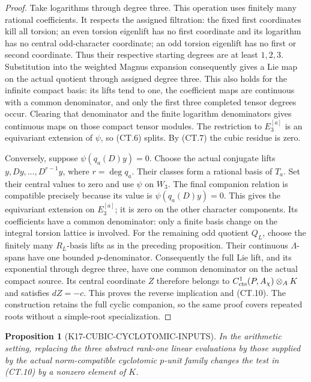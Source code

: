 \documentclass[11pt,a4paper]{article}
\newtheorem{proposition}[theorem]{Proposition}
\theoremstyle{definition}
\begin{document}
\begin{proof}
Take logarithms through degree three. This operation uses finitely
many rational coefficients. It respects the assigned filtration:
the fixed first coordinates kill all torsion; an even torsion
eigenlift has no first coordinate and its logarithm has no central
odd-character coordinate; an odd torsion eigenlift has no first
or second coordinate. Thus their respective starting degrees are
at least \(1,2,3\). Substitution into the weighted Magnus
expansion consequently gives a Lie map on the actual quotient
through assigned degree three. This also holds for the infinite
compact basis: its lifts tend to one, the coefficient maps are
continuous with a common denominator, and only the first three
completed tensor degrees occur. Clearing that denominator and
the finite logarithm denominators gives continuous maps on those
compact tensor modules. The restriction to \(E_3^{[a]}\) is an
equivariant extension of \(\psi\), so (CT.6) splits. By (CT.7)
the cubic residue is zero.

Conversely, suppose \(\psi(q_a(D)y)=0\). Choose the actual
conjugate lifts \(y,Dy,\ldots,D^{r-1}y\), where \(r=\deg q_a\).
Their classes form a rational basis of \(T_a\). Set their
central values to zero and use \(\psi\) on \(W_3\). The final
companion relation is compatible precisely because its value is
\(\psi(q_a(D)y)=0\). This gives the equivariant extension on
\(E_3^{[a]}\); it is zero on the other character components.
Its coefficients have a common denominator: only a finite basis
change on the integral torsion lattice is involved. For the
remaining odd quotient \(Q_L\), choose the finitely many
\(R_L\)-basis lifts as in the preceding proposition. Their
continuous \(\Lambda\)-spans have one bounded \(p\)-denominator.
Consequently the full Lie lift, and its exponential through degree
three, have one common denominator on the actual compact source.
Its central coordinate \(Z\) therefore belongs to
\(C^1_{\rm cts}(P,A_\chi)\otimes_A K\) and satisfies \(dZ=-c\).
This proves the reverse implication and (CT.10). The construction
retains the full cyclic companion, so the same proof covers repeated
roots without a simple-root specialization.
\end{proof}

\begin{proposition}[K17-CUBIC-CYCLOTOMIC-INPUTS]
\label{prop:cubic-cyclotomic-inputs}
In the arithmetic setting, replacing the three abstract rank-one
linear evaluations by those supplied by the actual norm-compatible
cyclotomic \(p\)-unit family changes the test in (CT.10) by a
nonzero element of \(K\).
\end{proposition}
\end{document}
